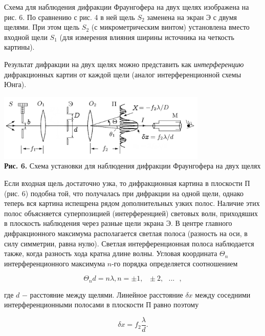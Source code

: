 \documentclass[a4paper,12pt]{article} %
\begin{document}
\hfill \break Схема для наблюдения дифракции Фраунгофера на двух щелях изображена на рис. 6. По сравнению с рис. 4 в ней щель $S_2$ заменена на экран Э с двумя щелями. При этом щель $S_2$ (с микрометрическим винтом) установлена вместо входной щели $S_1$ (для измерения влияния ширины источника на четкость картины). 

\hfill \break Результат дифракции на двух щелях можно представить как \textit{интерференцию} дифракционных картин от каждой щели (аналог интерференционной схемы Юнга).

\begin{center}
\includegraphics[width=0.75\textwidth]{4.3.1_6.png}\\
\textbf{Рис. 6.} Схема установки для наблюдения дифракции Фраунгофера на двух щелях \\
\end{center}

\hfill \break Если входная щель достаточно узка, то дифракционная картина в плоскости П (рис. 6) подобна той, что получалась при дифракции на одной щели, однако теперь вся картина испещрена рядом дополнительных узких полос. Наличие этих полос объясняется суперпозицией (интерференцией) световых волн, приходяших в плоскость наблюдения через разные щели экрана Э. В центре главного дифракционного максимума располагается светлая полоса (разность на оси, в силу симметрии, равна нулю). Светлая интерференционная полоса наблюдается также, когда разность хода кратна длине волны. Угловая координата $\Theta_n$ интерференционного максимума $n$-го порядка определяется соотношением

\begin{equation}\label{ linkname }
\Theta_n d = n\lambda, n = \pm 1, \text{ } \pm 2, \text{ } ... \text{ },
\end{equation}

\hfill \break где $d$ $-$ расстояние между щелями. Линейное расстояние $\delta x$ между соседними интерференционными полосами в плоскости П равно поэтому

\begin{equation}\label{ linkname }
\delta x = f_2 \frac {\lambda} {d}.
\end{equation}
\end{document}
